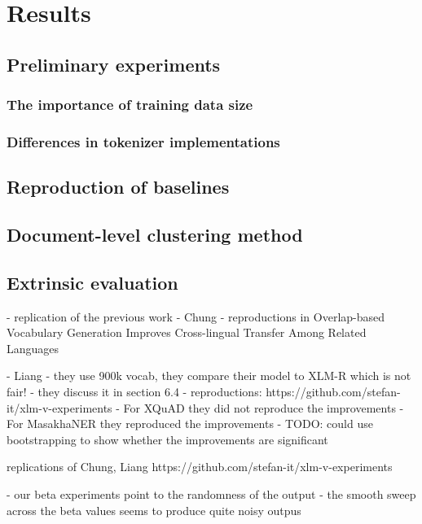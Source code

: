
\chapter{Results}
\section{Preliminary experiments}
\subsection{The importance of training data size}
\subsection{Differences in tokenizer implementations}

\section{Reproduction of baselines}
\section{Document-level clustering method}
\section{Extrinsic evaluation}


- replication of the previous work
    - Chung
        - reproductions in Overlap-based Vocabulary Generation Improves Cross-lingual Transfer Among Related Languages

    - Liang
        - they use 900k vocab, they compare their model to XLM-R which is not fair!
            - they discuss it in section 6.4
        - reproductions: https://github.com/stefan-it/xlm-v-experiments
            - For XQuAD they did not reproduce the improvements
            - For MasakhaNER they reproduced the improvements
            - TODO: could use bootstrapping to show whether the improvements are significant

replications of Chung, Liang
https://github.com/stefan-it/xlm-v-experiments

- our beta experiments point to the randomness of the output - the smooth sweep across the beta values seems to produce quite noisy outpus